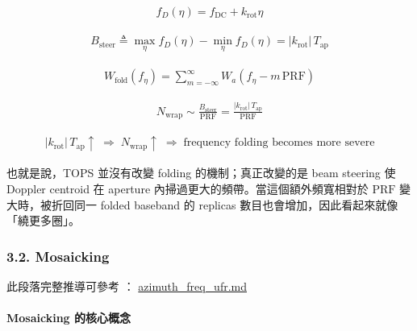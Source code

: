 \documentclass[10pt]{article}
\begin{document}
\begin{equation}
\begin{aligned}
f_D(\eta)=f_{\mathrm{DC}}+k_{\mathrm{rot}}\eta
\end{aligned}
\end{equation}

\begin{equation}
\begin{aligned}
B_{\mathrm{steer}}
\triangleq
\max_{\eta}f_D(\eta)-\min_{\eta}f_D(\eta)
=|k_{\mathrm{rot}}|\,T_{\mathrm{ap}}
\end{aligned}
\end{equation}

\begin{equation}
\begin{aligned}
W_{\mathrm{fold}}(f_\eta)
=\sum_{m=-\infty}^{\infty}
W_a\left(f_\eta-m\,\mathrm{PRF}\right)
\end{aligned}
\end{equation}

\begin{equation}
\begin{aligned}
N_{\mathrm{wrap}}
\sim
\frac{B_{\mathrm{steer}}}{\mathrm{PRF}}
=\frac{|k_{\mathrm{rot}}|\,T_{\mathrm{ap}}}{\mathrm{PRF}}
\end{aligned}
\end{equation}

\begin{equation}
\begin{aligned}
|k_{\mathrm{rot}}|\,T_{\mathrm{ap}}\uparrow
\;\Longrightarrow\;
N_{\mathrm{wrap}}\uparrow
\;\Longrightarrow\;
\text{frequency folding becomes more severe}
\end{aligned}
\end{equation}

也就是說，TOPS 並沒有改變 folding 的機制；真正改變的是 beam steering 使
Doppler centroid 在 aperture 內掃過更大的頻帶。當這個額外頻寬相對於
\(\mathrm{PRF}\) 變大時，被折回同一 folded baseband 的 replicas
數目也會增加，因此看起來就像「繞更多圈」。

\hypertarget{mosaicking}{%
\subsubsection{3.2. Mosaicking}\label{mosaicking}}

此段落完整推導可參考 ：
\href{./azimuth_freq_ufr.md}{azimuth\_freq\_ufr.md}

\hypertarget{mosaicking-ux7684ux6838ux5fc3ux6982ux5ff5}{%
\paragraph{Mosaicking
的核心概念}\label{mosaicking-ux7684ux6838ux5fc3ux6982ux5ff5}}
\end{document}
